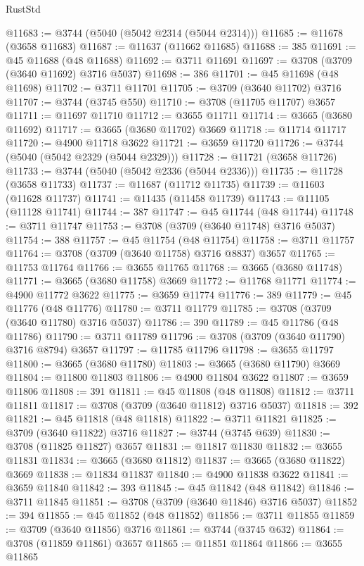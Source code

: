 \begin{lexlean}{RustStd}
\begin{coremodule}
@11683 := @3744 (@5040 (@5042 @2314 (@5044 @2314)))
@11685 := @11678 (@3658 @11683)
@11687 := @11637 (@11662 @11685)
@11688 := 385
@11691 := @45 @11688 (@48 @11688)
@11692 := @3711 @11691
@11697 := @3708 (@3709 (@3640 @11692) @3716 @5037)
@11698 := 386
@11701 := @45 @11698 (@48 @11698)
@11702 := @3711 @11701
@11705 := @3709 (@3640 @11702) @3716
@11707 := @3744 (@3745 @550)
@11710 := @3708 (@11705 @11707) @3657
@11711 := @11697 @11710
@11712 := @3655 @11711
@11714 := @3665 (@3680 @11692)
@11717 := @3665 (@3680 @11702) @3669
@11718 := @11714 @11717
@11720 := @4900 @11718 @3622
@11721 := @3659 @11720
@11726 := @3744 (@5040 (@5042 @2329 (@5044 @2329)))
@11728 := @11721 (@3658 @11726)
@11733 := @3744 (@5040 (@5042 @2336 (@5044 @2336)))
@11735 := @11728 (@3658 @11733)
@11737 := @11687 (@11712 @11735)
@11739 := @11603 (@11628 @11737)
@11741 := @11435 (@11458 @11739)
@11743 := @11105 (@11128 @11741)
@11744 := 387
@11747 := @45 @11744 (@48 @11744)
@11748 := @3711 @11747
@11753 := @3708 (@3709 (@3640 @11748) @3716 @5037)
@11754 := 388
@11757 := @45 @11754 (@48 @11754)
@11758 := @3711 @11757
@11764 := @3708 (@3709 (@3640 @11758) @3716 @8837) @3657
@11765 := @11753 @11764
@11766 := @3655 @11765
@11768 := @3665 (@3680 @11748)
@11771 := @3665 (@3680 @11758) @3669
@11772 := @11768 @11771
@11774 := @4900 @11772 @3622
@11775 := @3659 @11774
@11776 := 389
@11779 := @45 @11776 (@48 @11776)
@11780 := @3711 @11779
@11785 := @3708 (@3709 (@3640 @11780) @3716 @5037)
@11786 := 390
@11789 := @45 @11786 (@48 @11786)
@11790 := @3711 @11789
@11796 := @3708 (@3709 (@3640 @11790) @3716 @8794) @3657
@11797 := @11785 @11796
@11798 := @3655 @11797
@11800 := @3665 (@3680 @11780)
@11803 := @3665 (@3680 @11790) @3669
@11804 := @11800 @11803
@11806 := @4900 @11804 @3622
@11807 := @3659 @11806
@11808 := 391
@11811 := @45 @11808 (@48 @11808)
@11812 := @3711 @11811
@11817 := @3708 (@3709 (@3640 @11812) @3716 @5037)
@11818 := 392
@11821 := @45 @11818 (@48 @11818)
@11822 := @3711 @11821
@11825 := @3709 (@3640 @11822) @3716
@11827 := @3744 (@3745 @639)
@11830 := @3708 (@11825 @11827) @3657
@11831 := @11817 @11830
@11832 := @3655 @11831
@11834 := @3665 (@3680 @11812)
@11837 := @3665 (@3680 @11822) @3669
@11838 := @11834 @11837
@11840 := @4900 @11838 @3622
@11841 := @3659 @11840
@11842 := 393
@11845 := @45 @11842 (@48 @11842)
@11846 := @3711 @11845
@11851 := @3708 (@3709 (@3640 @11846) @3716 @5037)
@11852 := 394
@11855 := @45 @11852 (@48 @11852)
@11856 := @3711 @11855
@11859 := @3709 (@3640 @11856) @3716
@11861 := @3744 (@3745 @632)
@11864 := @3708 (@11859 @11861) @3657
@11865 := @11851 @11864
@11866 := @3655 @11865

\end{coremodule}
\end{lexlean}
